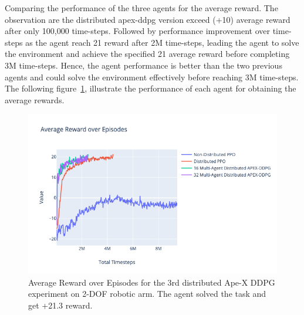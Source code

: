 Comparing the performance of the three agents for the average reward. The observation are the distributed apex-ddpg version exceed (+10) average reward after only 100,000 time-steps. Followed by performance improvement over time-steps as the agent reach 21 reward after 2M time-steps, leading the agent to solve the environment and achieve the specified 21 average reward before completing 3M time-steps. Hence, the agent performance is better than the two previous agents and could solve the environment effectively before reaching 3M time-steps. The following figure~\ref{fig:3rd_exp_avg_eps_reward}, illustrate the performance of each agent for obtaining the average rewards.
\begin{figure}[H] %
	\centering
	\includegraphics[width=1.2\linewidth]{figures/exps/3rd_exp/avg_eps_reward.png}
	\caption{Average Reward over Episodes for the 3rd distributed Ape-X DDPG experiment on 2-DOF robotic arm. The agent solved the task and get +21.3 reward.}
	\label{fig:3rd_exp_avg_eps_reward}
\end{figure}

